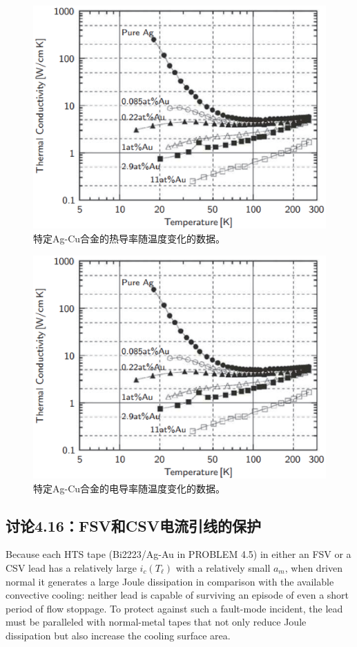 \begin{figure}[htbp]
	\centering
	\includegraphics[scale=0.6]{chpt4/figs/fig4.23.eps}
	\caption{特定Ag-Cu合金的热导率随温度变化的数据。}
\end{figure}
\begin{figure}[htbp]
	\centering
	\includegraphics[scale=0.6]{chpt4/figs/fig4.23.eps}
	\caption{特定Ag-Cu合金的电导率随温度变化的数据。}
\end{figure}

\subsection{讨论4.16：FSV和CSV电流引线的保护}
Because each HTS tape (Bi2223/Ag-Au in PROBLEM 4.5) in either an FSV or
a CSV lead has a relatively large $i_c(T_\ell)$ with a relatively small $a_m$, when driven
normal it generates a large Joule dissipation in comparison with the available
convective cooling: neither lead is capable of surviving an episode of even a short
period of flow stoppage. To protect against such a fault-mode incident, the lead
must be paralleled with normal-metal tapes that not only reduce Joule dissipation
but also increase the cooling surface area.

